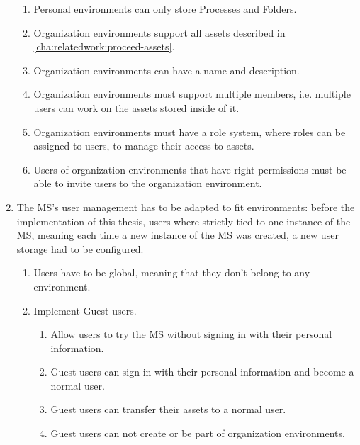 \begin{enumerate}
\begin{enumerate}
		      \item Personal environments can only store Processes and Folders.

		      \item Organization environments support all assets described in \ref{cha:relatedwork:proceed-assets}.

		      \item Organization environments can have a name and description.

		      \item Organization environments must support multiple members, i.e. multiple users can
		            work on the assets stored inside of it.

		      \item Organization environments must have a role system, where roles can be assigned to
		            users, to manage their access to assets.

		      \item Users of organization environments that have right permissions must be able to invite users
		            to the organization environment.
	      \end{enumerate}


	\item The MS's user management has to be adapted to fit environments: before the
	      implementation of this thesis, users where strictly tied to one instance of the MS,
	      meaning each time a new instance of the MS was created, a new user storage had to be
	      configured.
	      \begin{enumerate}
		      \item Users have to be global, meaning that they don't belong to any environment.

		      \item Implement Guest users.
		            \begin{enumerate}
			            \item Allow users to try the MS without signing in with their personal
			                  information.
			            \item Guest users can sign in with their personal information and become a normal
			                  user.
			            \item Guest users can transfer their assets to a normal user.

			            \item Guest users can not create or be part of organization environments.
		            \end{enumerate}


\end{enumerate}
\end{enumerate}
